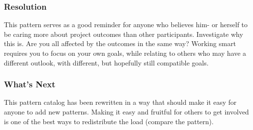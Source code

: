 \subsubsection*{Resolution}
This pattern serves as a good reminder for anyone who believes him- or
herself to be caring more about project outcomes than other
participants.  Investigate why this is.  Are you all affected by the
outcomes in the same way?  Working smart requires you to focus on your
own goals, while relating to others who may have a different outlook,
with different, but hopefully still compatible goals.

\subsubsection*{What's Next} This pattern catalog has been rewritten in a way
that should make it easy for anyone to add new patterns. Making it easy
and fruitful for others to get involved is one of the best ways to
redistribute the load (compare
the 
pattern).

\endgroup

    